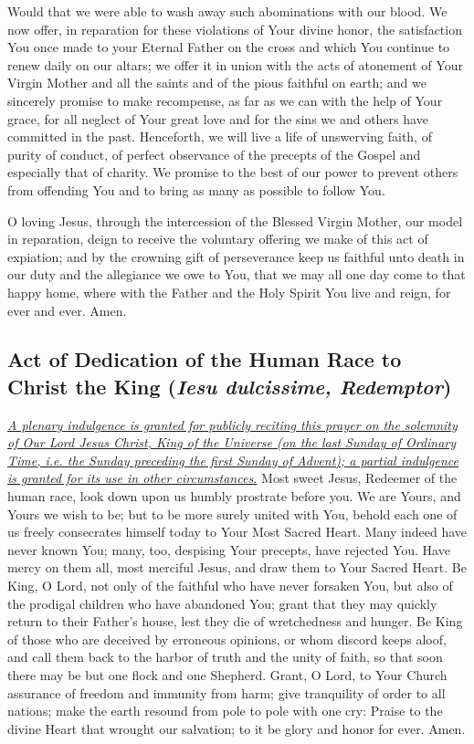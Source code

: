 \documentclass[12pt]{article}
\newcommand{\prayertitle}[1]{\subsection{#1}}
\newcommand{\indulgencedprayertitle}[1]{\prayertitle{#1 \protect\kreuz}}
\newcommand{\foreign}[1]{\textsl{#1}}
\newcommand{\note}[1]{{\small{\textsl{#1}}}\newline}
\newcommand{\linkednote}[2]{\hyperlink{#1}{\note{#2}}}
\begin{document}
Would that we were able to wash away such abominations with our blood.
We now offer, in reparation for these violations of Your divine honor, the satisfaction You once made to your Eternal Father on the cross and which You continue to renew daily on our altars;
we offer it in union with the acts of atonement of Your Virgin Mother and all the saints and of the pious faithful on earth;
and we sincerely promise to make recompense, as far as we can with the help of Your grace, for all neglect of Your great love and for the sins we and others have committed in the past.
Henceforth, we will live a life of unswerving faith, of purity of conduct, of perfect observance of the precepts of the Gospel and especially that of charity.
We promise to the best of our power to prevent others from offending You and to bring as many as possible to follow You.

O loving Jesus, through the intercession of the Blessed Virgin Mother, our model in reparation, deign to receive the voluntary offering we make of this act of expiation;
and by the crowning gift of perseverance keep us faithful unto death in our duty and the allegiance we owe to You, that we may all one day come to that happy home, where with the Father and the Holy Spirit You live and reign, for ever and ever. Amen.

\indulgencedprayertitle{Act of Dedication of the Human Race to Christ the King (\foreign{Iesu dulcissime, Redemptor})}
\linkednote{grant2}{A plenary indulgence is granted for publicly reciting this prayer on the solemnity of Our Lord Jesus Christ, King of the Universe (on the last Sunday of Ordinary Time, i.e. the Sunday preceding the first Sunday of Advent);
a partial indulgence is granted for its use in other circumstances.}
Most sweet Jesus, Redeemer of the human race, look down upon us humbly prostrate before you.
We are Yours, and Yours we wish to be;
but to be more surely united with You, behold each one of us freely consecrates himself today to Your Most Sacred Heart.
Many indeed have never known You;
many, too, despising Your precepts, have rejected You.
Have mercy on them all, most merciful Jesus, and draw them to Your Sacred Heart.
Be King, O Lord, not only of the faithful who have never forsaken You, but also of the prodigal children who have abandoned You;
grant that they may quickly return to their Father's house, lest they die of wretchedness and hunger.
Be King of those who are deceived by erroneous opinions, or whom discord keeps aloof, and call them back to the harbor of truth and the unity of faith, so that soon there may be but one flock and one Shepherd.
Grant, O Lord, to Your Church assurance of freedom and immunity from harm;
give tranquility of order to all nations;
make the earth resound from pole to pole with one cry:
Praise to the divine Heart that wrought our salvation;
to it be glory and honor for ever.
Amen.
\end{document}
